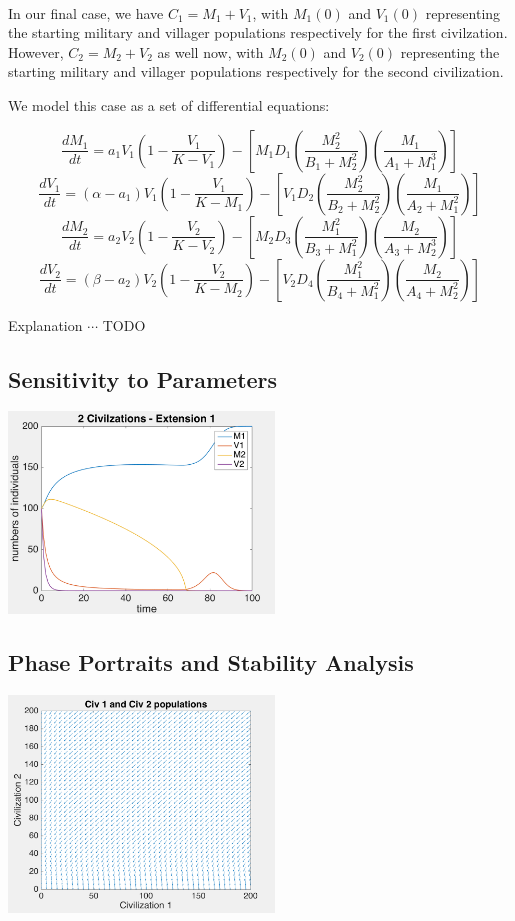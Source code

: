 \documentclass[12pt]{article}
\begin{document}
\paragraph{}
In our final case, we have $C_1 = M_1 + V_1$, with $M_1(0)$ and $V_1(0)$ representing the starting military and villager populations respectively for the first civilzation. However, $C_2 = M_2 + V_2$ as well now, with $M_2(0)$ and $V_2(0)$ representing the starting military and villager populations respectively for the second civilization. \par

We model this case as a set of differential equations: 

$$\frac{dM_1}{dt}=a_1V_1(1-\frac{V_1}{K-V_1})-[M_1D_1(\frac{M_2^2}{B_1+M_2^2})(\frac{M_1}{A_1+M_1^3})]$$
$$\frac{dV_1}{dt}=(\alpha - a_1)V_1(1-\frac{V_1}{K-M_1})-[V_1D_2(\frac{M_2^2}{B_2+M_2^2})(\frac{M_1}{A_2 +M_1^2})]$$
$$\frac{dM_2}{dt}=a_2V_2(1-\frac{V_2}{K-V_2})-[M_2 D_3(\frac{M_1^2}{B_3+M_1^2})(\frac{M_2}{A_3 +M_2^3})] $$
$$\frac{dV_2}{dt}=(\beta - a_2)V_2(1-\frac{V_2}{K-M_2})-[V_2 D_4(\frac{M_1^2}{B_4+M_1^2})(\frac{M_2}{A_4 +M_2^2})] $$

Explanation $\cdots$ TODO 

\subsection{Sensitivity to Parameters}
\includegraphics[width=200pt]{examplesim2}

\subsection{Phase Portraits and Stability Analysis}
\includegraphics[width=200pt]{phase3}
\end{document}

